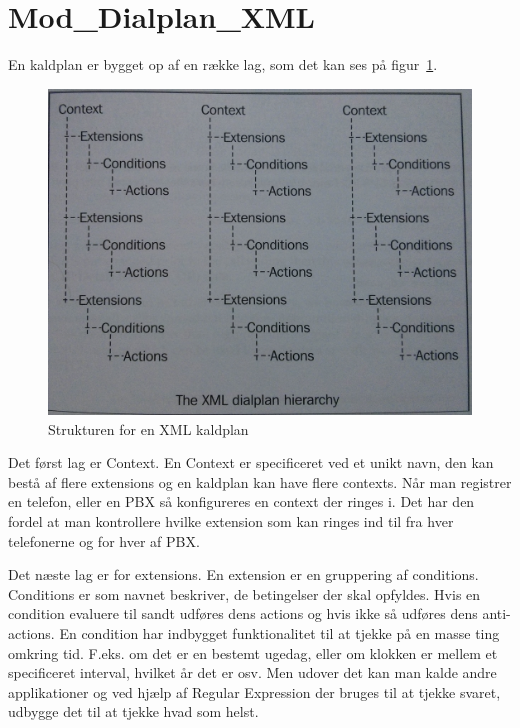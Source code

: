 \section{Mod\_Dialplan\_XML}
\label{sec:moddialplanxml}
En kaldplan er bygget op af en række lag, som det kan ses på figur~\ref{fig:xmldialplan}. 
\begin{figure}[ht!]
\centering
\includegraphics[scale=0.12]{images/dialplanstructure.jpg}
\caption{Strukturen for en XML kaldplan\citep{freeswitch12}}
\label{fig:xmldialplan}
\end{figure}

Det først lag er Context. 
En Context er specificeret ved et unikt navn, den kan bestå af flere extensions og en kaldplan kan have flere contexts. Når man registrer en telefon, eller en PBX så konfigureres en context der ringes i. Det har den fordel at man kontrollere hvilke extension som kan ringes ind til fra hver telefonerne og for hver af PBX.

Det næste lag er for extensions. En extension er en gruppering af conditions.
Conditions er som navnet beskriver, de betingelser der skal opfyldes. 
Hvis en condition evaluere til sandt udføres dens actions og hvis ikke så udføres dens anti-actions.
En condition har indbygget funktionalitet til at tjekke på en masse ting omkring tid. F.eks. om det er en bestemt ugedag, eller om klokken er mellem et specificeret interval, hvilket år det er osv. Men udover det kan man kalde andre applikationer og ved hjælp af Regular Expression der bruges til at tjekke svaret, udbygge det til at tjekke hvad som helst. 

